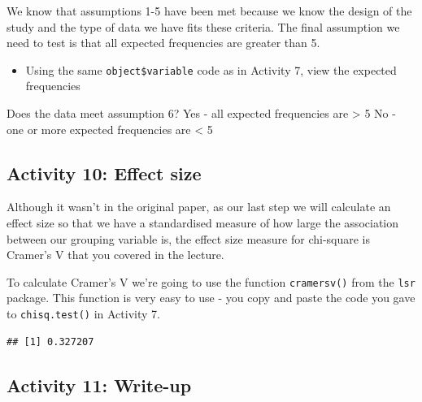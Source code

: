 \documentclass[]{book}
\newenvironment{Shaded}{\begin{snugshade}}{\end{snugshade}}
\newcommand{\DataTypeTok}[1]{\textcolor[rgb]{0.13,0.29,0.53}{#1}}
\newcommand{\KeywordTok}[1]{\textcolor[rgb]{0.13,0.29,0.53}{\textbf{#1}}}
\newcommand{\NormalTok}[1]{#1}
\newcommand{\OperatorTok}[1]{\textcolor[rgb]{0.81,0.36,0.00}{\textbf{#1}}}
\newcommand{\OtherTok}[1]{\textcolor[rgb]{0.56,0.35,0.01}{#1}}
\newcommand{\StringTok}[1]{\textcolor[rgb]{0.31,0.60,0.02}{#1}}
\providecommand{\tightlist}{%
  \setlength{\itemsep}{0pt}\setlength{\parskip}{0pt}}
\begin{document}
We know that assumptions 1-5 have been met because we know the design of the study and the type of data we have fits these criteria. The final assumption we need to test is that all expected frequencies are greater than 5.

\begin{itemize}
\tightlist
\item
  Using the same \texttt{object\$variable} code as in Activity 7, view the expected frequencies
\end{itemize}

Does the data meet assumption 6? Yes - all expected frequencies are \textgreater{} 5 No - one or more expected frequencies are \textless{} 5

\hypertarget{cramer}{%
\subsection{Activity 10: Effect size}\label{cramer}}

Although it wasn't in the original paper, as our last step we will calculate an effect size so that we have a standardised measure of how large the association between our grouping variable is, the effect size measure for chi-square is Cramer's V that you covered in the lecture.

To calculate Cramer's V we're going to use the function \texttt{cramersv()} from the \texttt{lsr} package. This function is very easy to use - you copy and paste the code you gave to \texttt{chisq.test()} in Activity 7.

\begin{Shaded}
\end{Shaded}

\begin{verbatim}
## [1] 0.327207
\end{verbatim}

\hypertarget{activity-11-write-up}{%
\subsection{Activity 11: Write-up}\label{activity-11-write-up}}
\end{document}
